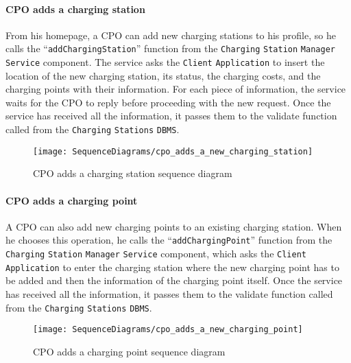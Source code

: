 \paragraph{CPO adds a charging station}
From his homepage, a CPO can add new charging stations to his profile, so he calls the ``\verb|addChargingStation|'' function from the \verb|Charging| \verb|Station| \verb|Manager| \verb|Service| component.
The service asks the \verb|Client| \verb|Application| to insert the location of the new charging station, its status, the charging costs, and the charging points with their information.
For each piece of information, the service waits for the CPO to reply before proceeding with the new request.
Once the service has received all the information, it passes them to the validate function called from the \verb|Charging| \verb|Stations| \verb|DBMS|\@.
\begin{figure}[H]
    \begin{center}
        \texttt{[image: SequenceDiagrams/cpo\_adds\_a\_new\_charging\_station]}
        \caption{CPO adds a charging station sequence diagram}
        \label{cpo_adds_new_charging_station}
    \end{center}
\end{figure}

\paragraph{CPO adds a charging point}
A CPO can also add new charging points to an existing charging station.
When he chooses this operation, he calls the ``\verb|addChargingPoint|'' function from the \verb|Charging| \verb|Station| \verb|Manager| \verb|Service| component, which asks the \verb|Client| \verb|Application| to enter the charging station where the new charging point has to be added and then the information of the charging point itself.
Once the service has received all the information, it passes them to the validate function called from the \verb|Charging| \verb|Stations| \verb|DBMS|\@.
\begin{figure}[H]
    \begin{center}
        \texttt{[image: SequenceDiagrams/cpo\_adds\_a\_new\_charging\_point]}
        \caption{CPO adds a charging point sequence diagram}
        \label{cpo_adds_new_charging_point}
    \end{center}
\end{figure}

